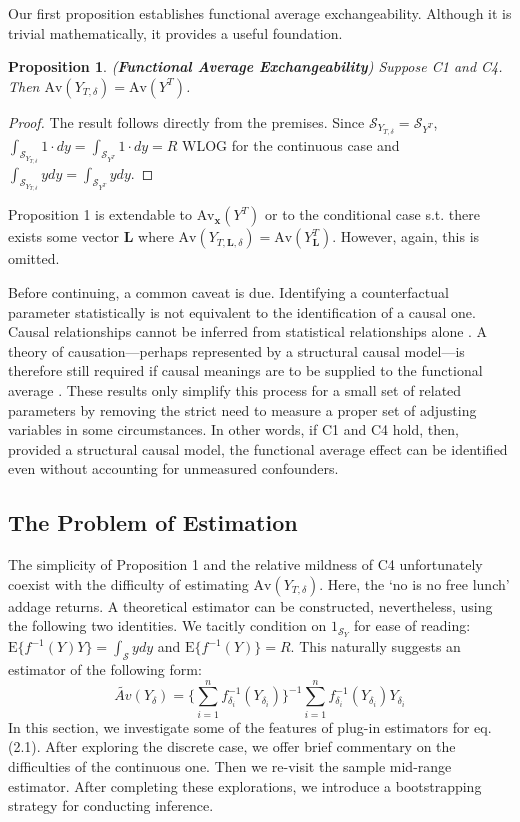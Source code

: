 \documentclass[12pt]{amsart}
\theoremstyle{plain}%
\newtheorem{proposition}{Proposition}
\theoremstyle{definition}
\theoremstyle{remark}
\numberwithin{equation}{section}
\begin{document}
Our first proposition establishes functional average exchangeability. Although it is trivial mathematically, it provides a useful foundation. 
\begin{proposition}{(\textbf{Functional Average Exchangeability})}
Suppose C1 and C4. Then $\text{Av}(Y_{T, \delta}) = \text{Av}(Y^{T})$.
\end{proposition}
\begin{proof}
The result follows directly from the premises. Since $\mathcal{S}_{Y_{T, \delta}} = \mathcal{S}_{Y^T}$, $\int_{\mathcal{S}_{Y_{T,\delta}}} 1 \cdot dy = \int_{\mathcal{S}_{Y^T}} 1 \cdot dy = R$ WLOG for the continuous case and $\int_{\mathcal{S}_{Y_{T,\delta}}} y dy = \int_{\mathcal{S}_{Y^T}} y dy$.
\end{proof}
Proposition 1 is extendable to $\text{Av}_{\mathbf{x}}(Y^T)$ or to the conditional case s.t. there exists some vector $\mathbf{L}$ where $\text{Av}(Y_{T, \mathbf{L}, \delta}) = \text{Av}(Y_{\mathbf{L}}^{T})$. However, again, this is omitted.

Before continuing, a common caveat is due. Identifying a counterfactual parameter statistically is not equivalent to the identification of a causal one. Causal relationships cannot be inferred from statistical relationships alone \cite{pearl2003statistics}. A theory of causation---perhaps represented by a structural causal model---is therefore still required if causal meanings are to be supplied to the functional average \cite{pearl2010causal, hernan2010causal}. These results only simplify this process for a small set of related parameters by removing the strict need to measure a proper set of adjusting variables in some circumstances. In other words, if C1 and C4 hold, then, provided a structural causal model, the functional average effect can be identified even without accounting for unmeasured confounders.  

\subsection{The Problem of Estimation}
The simplicity of Proposition 1 and the relative mildness of C4 unfortunately coexist with the difficulty of estimating $\text{Av}(Y_{T, \delta})$. Here, the `no is no free lunch' addage returns. A theoretical estimator can be constructed, nevertheless, using the following two identities. We tacitly condition on $1_{\mathcal{S}_Y}$ for ease of reading: $\text{E}\{ f^{-1}(Y)Y \} = \int_{\mathcal{S}} y dy$ and $\text{E}\{ f^{-1}(Y) \} = R$. This naturally suggests an estimator of the following form:
\begin{equation}
\tilde{Av}(Y_{\delta}) = \{ \sum^n_{i=1} f_{\delta_i}^{-1}(Y_{\delta_i})\}^{-1} \sum^n_{i=1} f_{\delta_i}^{-1}(Y_{\delta_i}) Y_{\delta_i}
\end{equation}
In this section, we investigate some of the features of plug-in estimators for eq. (2.1). After exploring the discrete case, we offer brief commentary on the difficulties of the continuous one. Then we re-visit the sample mid-range estimator. After completing these explorations, we introduce a bootstrapping strategy for conducting inference.
\end{document}

